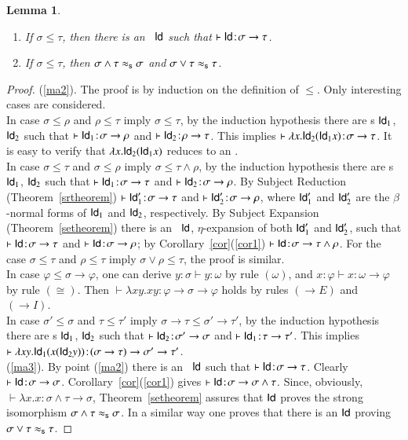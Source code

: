 \documentclass[UKenglish]{eptcs}
\newtheorem{lemma}[fact]{Lemma}
\newcommand{\dup}{\! : \!}
\newcommand{\tA}{\sigma}       \newcommand{\tB}{\tau}
\newcommand{\tC}{\rho}
\newcommand{\tu}{\omega}
\newcommand{\tS}{\sigma}       \newcommand{\tT}{\tau}
\newcommand{\id}{{\sf Id}}
\newcommand{\labelx}[1]{\label{#1}}
\newcommand{\isos}{\approx_{\sf s}}
\newcommand{\esim}{\cong}
\begin{document}
\begin{lemma}\labelx{ma}
\begin{enumerate}
\item\labelx{ma2} If $\tS \leq  \tT$, then there is an \fhi\ $\id$ such that $\vdash  \id \dup \tA \to \tB$.
\item\labelx{ma3} If $\tS \leq  \tT$, then $\tS \wedge  \tT\isos\tS$ and $\tS \vee \tT\isos\tT$.
\end{enumerate} \end{lemma}
\begin{proof}

 (\ref{ma2}). The proof is by induction on the definition of $\leq$. Only interesting cases are considered. \\
 In case $\tA\leq\tC$ and $\tC\leq\tB$ imply $\tA\leq\tB$,  by the induction hypothesis there are \fhi s $\id_1$, $\id_2$ such that $\vdash \id_1\dup \tA\to\tC$  and $\vdash \id_2\dup \tC\to\tB$. This implies $\vdash \lambda x. \id_2(\id_1x)\dup \tA\to\tB$. It is easy to verify that $\lambda x. \id_2(\id_1x)$ reduces to an \fhi.\\
 In case $\tA\leq\tB$ and $\tA\leq\tC$ imply $\tA\leq\tB\wedge\tC$, by the induction hypothesis there are \fhi s $\id_1$, $\id_2$ such that $\vdash \id_1\dup \tA\to\tB$  and $\vdash \id_2\dup \tA\to\tC$. By Subject Reduction (Theorem~\ref{srtheorem}) $\vdash \id'_1\dup \tA\to\tB$  and $\vdash \id'_2\dup \tA\to\tC$, where $\id'_1$ and $\id'_2$ are the $\beta$-normal forms of $\id_1$ and $\id_2$, respectively.
 By Subject Expansion (Theorem~\ref{setheorem}) there is an \fhi\ $\id$, $\eta$-expansion of both $\id'_1$ and $\id'_2$,
such that $\vdash \id\dup \tA\to\tB$  and $\vdash \id\dup \tA\to\tC$; by Corollary~\ref{cor}(\ref{cor1}) $\vdash \id\dup \tA\to\tB\wedge\tC$.
 For the case $\tA\leq\tB$ and $\tC\leq\tB$ imply $\tA\vee\tC \leq \tB$, the proof is similar.\\
 In case $\varphi\leq\tA\to\varphi$, one can derive $y\dup\tS\vdash y\dup\tu$ by rule $(\tu)$, and $x\dup\varphi\vdash x\dup\tu\to\varphi$ by rule $(\esim)$. Then $\vdash\lambda xy. xy\dup\varphi\to\tA\to\varphi$ holds by rules $(\to E)$ and $(\to I)$.\\
 In case $\tA'\leq\tA$ and $\tB\leq\tB'$ imply $\tA\to\tB\leq\tA'\to\tB'$, by the induction hypothesis there are \fhi s $\id_1$, $\id_2$ such that \mbox{$\vdash \id_2\dup \tA'\to\tA$}  and $\vdash \id_1\dup \tB\to\tB'$. This implies $\vdash \lambda xy. \id_1(x(\id_2y))\dup (\tA\to\tB)\to\tA'\to\tB'$. \\
 (\ref{ma3}). By point (\ref{ma2}) there is an \fhi\ $\id$ such that $\vdash  \id \dup \tA \to \tB$. Clearly $\vdash  \id \dup \tA \to \tA$. Corollary~\ref{cor}(\ref{cor1}) gives $\vdash  \id \dup \tA \to \tA\wedge\tB$.
Since, obviously,  $\vdash  \lambda x.x \dup \tA\wedge\tB \to \tA$, Theorem~\ref{setheorem} assures that $\id$ proves the strong isomorphism $\tA\wedge\tB \isos\tA$. In a similar way one proves that there is an $\id$
proving $\tA\vee\tB \isos\tB$.

\end{proof}
\end{document}
